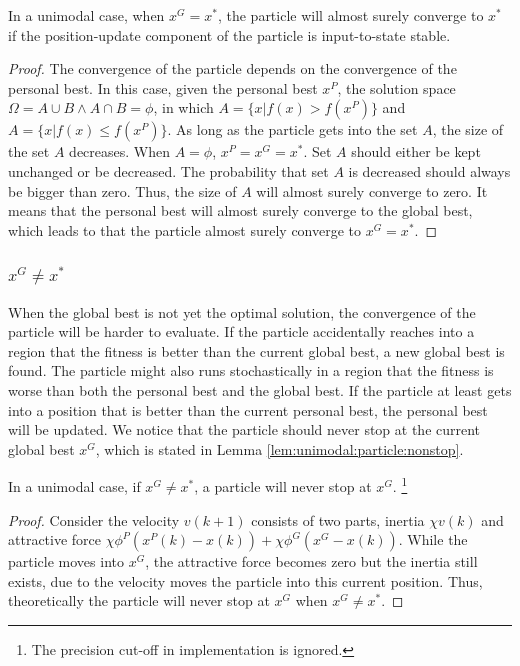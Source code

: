 \begin{mythm}
\label{thm:unimodal:particle:converge}
In a unimodal case, when $ x^{G} = x^{*} $, the particle will almost surely converge to $ x^{*} $ if the position-update component of the particle is input-to-state stable.
\begin{proof}
The convergence of the particle depends on the convergence of the personal best.
In this case, given the personal best $ x^{P} $, the solution space $ \Omega = A \cup B \land A \cap B = \phi $, in which 
$ A = \{ x | f(x) > f(x^{P}) \} $ and $ A = \{ x | f(x) \leq f(x^{P}) \} $.
As long as the particle gets into the set $ A $, the size of the set $ A $ decreases.
When $ A = \phi $, $ x^{P} = x^{G} = x^{*} $.
Set $ A $ should either be kept unchanged or be decreased.
The probability that set $ A $ is decreased should always be bigger than zero.
Thus, the size of $ A $ will almost surely converge to zero.
It means that the personal best will almost surely converge to the global best, which leads to that the particle almost surely converge to $ x^{G}  = x^{*} $.
\end{proof}
\end{mythm}

\subsubsection{ $ x^{G} \not = x^{*}  $ }

When the global best is not yet the optimal solution, the convergence of the particle will be harder to evaluate.
If the particle accidentally reaches into a region that the fitness is better than the current global best, a new global best is found.
The particle might also runs stochastically in a region that the fitness is worse than both the personal best and the global best.
If the particle at least gets into a position that is better than the current personal best, the personal best will be updated. 
We notice that the particle should never stop at the current global best $ x^{G} $, which is stated in Lemma \ref{lem:unimodal:particle:nonstop}.

\begin{mylem}
\label{lem:unimodal:particle:nonstop}
In a unimodal case, if $ x^{G} \not = x^{*} $, a particle will never stop at $ x^{G} $. 
\footnote{The precision cut-off in implementation is ignored.}
\begin{proof}
Consider the velocity $ v(k+1) $ consists of two parts, inertia $ \chi v(k) $ and attractive force $ \chi \phi^{P} (x^{P}(k) - x(k) ) + \chi \phi^{G} ( x^{G} - x(k) ) $.
While the particle moves into $ x^{G} $, the attractive force becomes zero but the inertia still exists, due to the velocity moves the particle into this current position.
Thus, theoretically the particle will never stop at $ x^{G} $ when $ x^{G} \not = x^{*} $.
\end{proof} 
\end{mylem}

